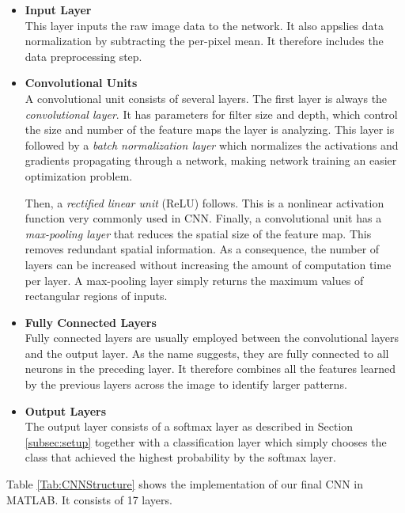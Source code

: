 \begin{itemize}
	
	\item \textbf{Input Layer}\\
	This layer inputs the raw image data to the network. It also appslies data normalization by subtracting the per-pixel mean. It therefore includes the data preprocessing step.
	
	\item \textbf{Convolutional Units}\\
	A convolutional unit consists of several layers. The first layer is always the \textit{convolutional layer}. It has parameters for filter size and depth, which control the size and number of the feature maps the layer is analyzing. This layer is followed by a \textit{batch normalization layer} which normalizes the activations and gradients propagating through a network, making network training an easier optimization problem.
	
	Then, a \textit{rectified linear unit} (ReLU) follows. This is a nonlinear activation function very commonly used in CNN. Finally, a convolutional unit has a \textit{max-pooling layer} that reduces the spatial size of the feature map. This removes redundant spatial information. As a consequence, the number of layers can be increased without increasing the amount of computation time per layer. A max-pooling layer simply returns the maximum values of rectangular regions of inputs.
	
	\item \textbf{Fully Connected Layers}\\
	Fully connected layers are usually employed between the convolutional layers and the output layer. As the name suggests, they are fully connected to all neurons in the preceding layer. It therefore combines all the features learned by the previous layers across the image to identify larger patterns.
	
	\item \textbf{Output Layers}\\
	The output layer consists of a softmax layer as described in Section \ref{subsec:setup} together with a classification layer which simply chooses the class that achieved the highest probability by the softmax layer.
	
\end{itemize}

Table \ref{Tab:CNNStructure} shows the implementation of our final CNN in MATLAB. It consists of 17 layers.
 
